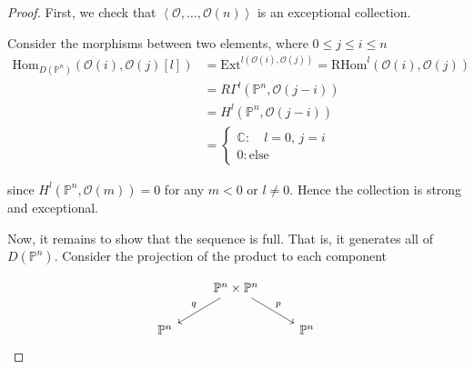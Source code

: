 \begin{proof}

    First, we check that $\left< \mathcal{O}, \dots, \mathcal{O} (n) \right>$ is an exceptional collection. 
    
    Consider the morphisms between two elements, where $0\leq j\leq i \leq n$ 
    \begin{align*}
    \text{Hom}_{D(\mathbb{P}^{n})} (\mathcal{O}(i),\mathcal{O}(j)[l]) &= \text{Ext}^{l(\mathcal{O}(i),\mathcal{O}(j))}= \text{RHom}^{l}(\mathcal{O}(i),\mathcal{O}(j)) \\ 
    &= R\Gamma^{l}(\mathbb{P}^{n},\mathcal{O}(j-i))  \\
    &= H^{l}(\mathbb{P}^{n},\mathcal{O}(j-i)) \\
    &= \begin{cases}
    \mathbb{C} :\quad l=0, \,j=i \\
    0 : \text{else}
    \end{cases}
    \end{align*}
    
    since $H^{l}(\mathbb{P}^{n}, \mathcal{O}(m))=0$ for any $m<0$ or $l \neq 0$. Hence the collection is strong and exceptional. 
    
    Now, it remains to show that the sequence is full. That is, it generates all of $D(\mathbb{P}^{n})$.  Consider the projection of the product to each component 
    
    \[\begin{tikzcd}
        & {\mathbb P^n \times \mathbb P^n} \\
        {\mathbb P^n} && {\mathbb P^n}
        \arrow["q"', from=1-2, to=2-1]
        \arrow["p", from=1-2, to=2-3]
    \end{tikzcd}\]
    

\end{proof}
